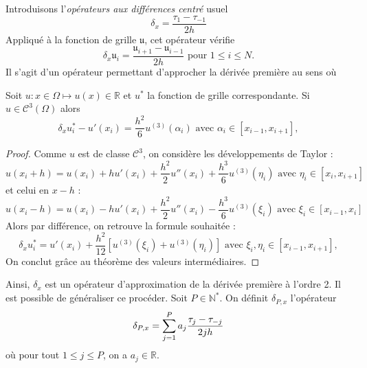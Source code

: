 Introduisons l'\textit{opérateurs aux différences centré} usuel
\begin{equation}
\delta_x = \dfrac{\tau_1 - \tau_{-1}}{2h}
\end{equation}
Appliqué à la fonction de grille $\mathfrak{u}$, cet opérateur vérifie 
\begin{equation}
\delta_x \mathfrak{u}_i = \dfrac{\mathfrak{u}_{i+1} - \mathfrak{u}_{i-1}}{2h} \text{ pour } 1 \leq i \leq N.
\end{equation}
Il s'agit d'un opérateur permettant d'approcher la dérivée première au sens où

\begin{proposition}
Soit $u: x \in \Omega \mapsto u(x) \in \mathbb{R}$ et $u^*$ la fonction de grille correspondante. Si $u \in \mathcal{C}^3 (\Omega)$ alors 
\begin{equation}
\delta_x u^*_i - u'(x_i) = \dfrac{h^2}{6} u^{(3)}(\alpha_i) \text{ avec } \alpha_i \in [x_{i-1}, x_{i+1}],
\end{equation}
\end{proposition}

\begin{proof}
Comme $u$ est de classe $\mathcal{C}^3$, on considère les développements de Taylor :
\begin{equation}
u(x_i+h) = u(x_i) + h u'(x_i) + \dfrac{h^2}{2} u''(x_i) + \dfrac{h^3}{6} u^{(3)} (\eta_i) \text{ avec } \eta_i \in [x_i, x_{i+1}]
\end{equation}
et celui en $x-h$ :
\begin{equation}
u(x_i-h) = u(x_i) - h u'(x_i) + \dfrac{h^2}{2} u''(x_i) - \dfrac{h^3}{6}u^{(3)}(\xi_i) \text{ avec } \xi_i \in [x_{i-1}, x_{i}]
\end{equation}
Alors par différence, on retrouve la formule souhaitée : 
\begin{equation}
\delta_x u^*_i = u'(x_i) + \dfrac{h^2}{12} \left[ u^{(3)}(\xi_i) + u^{(3)}(\eta_i) \right]  \text{ avec } \xi_i, \eta_i \in [x_{i-1}, x_{i+1}],
\end{equation}
On conclut grâce au théorème des valeurs intermédiaires.
\end{proof}

Ainsi, $\delta_x$ est un opérateur d'approximation de la dérivée première à l'ordre 2. Il est possible de généraliser ce procéder.
Soit $P \in \mathbb{N}^*$. 
On définit $\delta_{P,x}$ l'opérateur
\begin{equation}
\delta_{P,x} = \displaystyle\sum\limits_{j=1}^P a_j \dfrac{\tau_j - \tau_{-j}}{2 j h}
\label{eq:explicite_dx}
\end{equation}
où  pour tout $1 \leq j \leq P$, on a $a_j \in \mathbb{R}$. 




